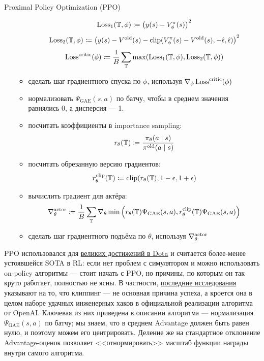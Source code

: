 \begin{algorithm}[label = PPOalgorithm]{Proximal Policy Optimization (PPO)}
\begin{enumerate}
\begin{itemize}
    $$\operatorname{Loss}_1(\mathbb{T}, \phi) \coloneqq \left( y(s) - V^\pi_\phi(s) \right) ^2$$
    $$\operatorname{Loss}_2(\mathbb{T}, \phi) \coloneqq \left( y(s) - V^{\mathrm{old}}(s) - \mathrm{clip}(V^\pi_\phi(s) - V^{\mathrm{old}}(s), -\hat{\epsilon}, \hat{\epsilon}) \right) ^2$$
    $$\operatorname{Loss}^{\mathrm{critic}}(\phi) \coloneqq \frac{1}{B}\sum_{\mathbb{T}} \max(\operatorname{Loss}_1(\mathbb{T}, \phi), \operatorname{Loss}_2(\mathbb{T}, \phi))$$
    \item сделать шаг градиентного спуска по $\phi$, используя $\nabla_\phi \operatorname{Loss}^{\mathrm{critic}}(\phi)$
    \item нормализовать $\Psi_{\mathrm{GAE}}(s, a)$ по батчу, чтобы в среднем значения равнялись 0, а дисперсия --- 1.
    \item посчитать коэффициенты в importance sampling:
    $$r_\theta(\mathbb{T}) \coloneqq \frac{\pi_\theta(a \mid s)}{\pi^{\mathrm{old}}(a \mid s)}$$
    \item посчитать обрезанную версию градиентов:
    $$r_\theta^{\mathrm{clip}}(\mathbb{T}) \coloneqq \mathrm{clip}(r_\theta(\mathbb{T}), 1 - \epsilon, 1 + \epsilon)$$
    \item вычислить градиент для актёра:
    $$\nabla^{\mathrm{actor}}_\theta \coloneqq \frac{1}{B}\sum_{\mathbb{T}} \nabla_\theta \min \left( r_\theta(\mathbb{T})\Psi_{\mathrm{GAE}}(s, a), r_\theta^{\mathrm{clip}}(\mathbb{T})\Psi_{\mathrm{GAE}}(s, a) \right) $$
    \item сделать шаг градиентного подъёма по $\theta$, используя $\nabla^{\mathrm{actor}}_\theta$
    \end{itemize}
\end{enumerate}
\end{algorithm}

\begin{remark}
PPO использовался для \href{https://openai.com/blog/openai-five/}{великих достижений в Dota} и считается более-менее устоявшейся SOTA в RL: если нет проблем с симулятором и можно использовать on-policy алгоритмы --- стоит начать с PPO, но причины, по которым он так круто работает, полностью не ясны. В частности, \href{https://openreview.net/forum?id=r1etN1rtPB}{последние исследования} указывают на то, что клиппинг --- не основная причина успеха, а кроется она в целом наборе удачных инженерных хаков в официальной реализации алгоритма от OpenAI. Ключевая из них приведена в описании алгоритма --- нормализация $\Psi_{\mathrm{GAE}}(s, a)$ по батчу; мы знаем, что в среднем Advantage должен быть равен нулю, и поэтому можем его центрировать. Деление же на стандартное отклонение Advantage-оценок позволяет <<отнормировать>> масштаб функции награды внутри самого алгоритма.
\end{remark}


